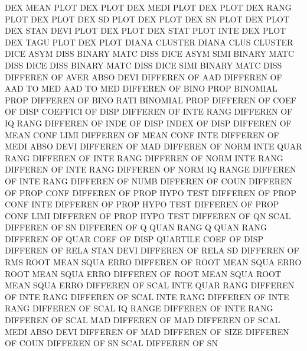 DEX      MEAN PLOT                      DEX      PLOT
DEX      MEDI PLOT                      DEX      PLOT
DEX      RANG PLOT                      DEX      PLOT
DEX      SD   PLOT                      DEX      PLOT
DEX      SN   PLOT                      DEX      PLOT
DEX      STAN DEVI PLOT                 DEX      PLOT
DEX      STAT PLOT INTE                 DEX      PLOT
DEX      TAGU PLOT                      DEX      PLOT
DIANA                                   CLUSTER
DIANA    CLUS                           CLUSTER
DICE     ASYM DISS                      BINARY   MATC DISS
DICE     ASYM SIMI                      BINARY   MATC DISS
DICE     DISS                           BINARY   MATC DISS
DICE     SIMI                           BINARY   MATC DISS
DIFFEREN OF   AVER ABSO DEVI            DIFFEREN OF   AAD
DIFFEREN OF   AAD  TO   MED             AAD      TO   MED
DIFFEREN OF   BINO PROP                 BINOMIAL PROP
DIFFEREN OF   BINO RATI                 BINOMIAL PROP
DIFFEREN OF   COEF OF   DISP            COEFFICI OF   DISP
DIFFEREN OF   INTE RANG                 DIFFEREN OF   IQ   RANG
DIFFEREN OF   INDE OF   DISP            INDEX    OF   DISP
DIFFEREN OF   MEAN CONF LIMI            DIFFEREN OF   MEAN CONF INTE
DIFFEREN OF   MEDI ABSO DEVI            DIFFEREN OF   MAD
DIFFEREN OF   NORM INTE QUAR RANG       DIFFEREN OF   INTE RANG
DIFFEREN OF   NORM INTE RANG            DIFFEREN OF   INTE RANG
DIFFEREN OF   NORM IQ   RANGE           DIFFEREN OF   INTE RANG
DIFFEREN OF   NUMB                      DIFFEREN OF   COUN
DIFFEREN OF   PROP CONF                 DIFFEREN OF   PROP HYPO TEST
DIFFEREN OF   PROP CONF INTE            DIFFEREN OF   PROP HYPO TEST
DIFFEREN OF   PROP CONF LIMI            DIFFEREN OF   PROP HYPO TEST
DIFFEREN OF   QN   SCAL                 DIFFEREN OF   SN
DIFFEREN OF   Q    QUAN RANG            Q        QUAN RANG
DIFFEREN OF   QUAR COEF OF   DISP       QUARTILE COEF OF   DISP
DIFFEREN OF   RELA STAN DEVI            DIFFEREN OF   RELA SD
DIFFEREN OF   RMS                       ROOT     MEAN SQUA ERRO
DIFFEREN OF   ROOT MEAN SQUA ERRO       ROOT     MEAN SQUA ERRO
DIFFEREN OF   ROOT MEAN SQUA            ROOT     MEAN SQUA ERRO
DIFFEREN OF   SCAL INTE QUAR RANG       DIFFEREN OF   INTE RANG
DIFFEREN OF   SCAL INTE RANG            DIFFEREN OF   INTE RANG
DIFFEREN OF   SCAL IQ   RANGE           DIFFEREN OF   INTE RANG
DIFFEREN OF   SCAL MAD                  DIFFEREN OF   MAD
DIFFEREN OF   SCAL MEDI ABSO DEVI       DIFFEREN OF   MAD
DIFFEREN OF   SIZE                      DIFFEREN OF   COUN
DIFFEREN OF   SN   SCAL                 DIFFEREN OF   SN
